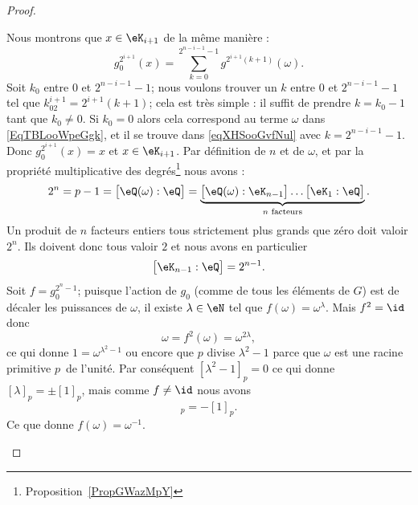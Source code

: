 \begin{proof}
\begin{subproof}
\begin{subproof}
			Nous montrons que \( x\in \eK_{i+1}\) de la même manière :
			\begin{equation}    \label{eqXHSooGvfNul}
				g_0^{2^{i+1}}(x)=\sum_{k=0}^{2^{n-i-1}-1}g^{2^{i+1}(k+1)}(\omega).
			\end{equation}
			Soit \( k_0\) entre \( 0\) et \( 2^{n-i-1}-1\); nous voulons trouver un \( k\) entre \( 0\) et \( 2^{n-i-1}-1\) tel que \( k_02^{i+1}=2^{i+1}(k+1)\); cela est très simple : il suffit de prendre \( k=k_0-1\) tant que \( k_0\neq 0\). Si \( k_0=0\) alors cela correspond au terme \( \omega\) dans \eqref{EqTBLooWpeGgk}, et il se trouve dans \eqref{eqXHSooGvfNul} avec \( k=2^{n-i-1}-1\). Donc \( g_0^{2^{i+1}}(x)=x\) et \( x\in \eK_{i+1}\).
			Par définition de \( n\) et de \( \omega\), et par la propriété multiplicative des degrés\footnote{Proposition~\ref{PropGWazMpY}} nous avons :
			\begin{equation}
				2^n=p-1=\big[ \eQ(\omega):\eQ \big]=\underbrace{\big[ \eQ(\omega):\eK_{n-1} \big]\ldots\big[ \eK_1:\eQ \big]}_{ n\text{ facteurs}}.
			\end{equation}
			Un produit de \( n\) facteurs entiers tous strictement plus grands que zéro doit valoir \( 2^n\). Ils doivent donc tous valoir \( 2\) et nous avons en particulier
			\begin{equation}
				\big[ \eK_{n-1}:\eQ \big]=2^{n-1}.
			\end{equation}
			\spitem[\( \cos(2\pi/p)\in \eK_{n-1}\)]
			Soit \( f=g_0^{2^n-1}\); puisque l'action de \( g_0\) (comme de tous les éléments de \( G\)) est de décaler les puissances de \( \omega\), il existe \( \lambda\in \eN\) tel que \( f(\omega)=\omega^{\lambda}\). Mais \( f^2=\id\) donc
			\begin{equation}
				\omega=f^2(\omega)=\omega^{2\lambda},
			\end{equation}
			ce qui donne \( 1=\omega^{\lambda^2-1}\) ou encore que \( p\) divise \( \lambda^2-1\) parce que \( \omega\) est une racine primitive \( p\)\ieme\ de l'unité. Par conséquent \( [\lambda^2-1]_p=0\) ce qui donne \( [\lambda]_p=\pm[1]_p\), mais comme \( f\neq \id\) nous avons
			\begin{equation}
				[\lambda]_p=-[1]_p.
			\end{equation}
			Ce que donne \( f(\omega)=\omega^{-1}\).


\end{subproof}
\end{subproof}
\end{proof}

